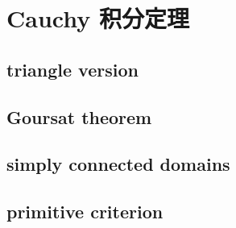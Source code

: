 \section{Cauchy 积分定理}
\label{b3:sec:0202}


\subsection{triangle version}
\label{b3:subsec:020201}

\subsection{Goursat theorem}
\label{b3:subsec:020202}

\subsection{simply connected domains}
\label{b3:subsec:020203}

\subsection{primitive criterion}
\label{b3:subsec:020204}


